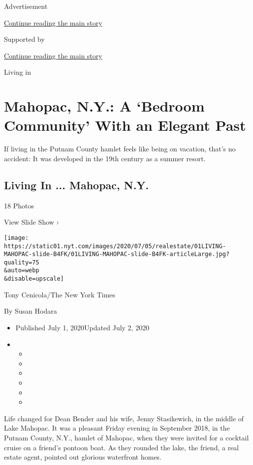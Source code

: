 Advertisement

\protect\hyperlink{after-top}{Continue reading the main story}

Supported by

\protect\hyperlink{after-sponsor}{Continue reading the main story}

Living in

\hypertarget{mahopac-ny-a-bedroom-community-with-an-elegant-past}{%
\section{Mahopac, N.Y.: A `Bedroom Community' With an Elegant
Past}\label{mahopac-ny-a-bedroom-community-with-an-elegant-past}}

If living in the Putnam County hamlet feels like being on vacation,
that's no accident: It was developed in the 19th century as a summer
resort.

\href{https://www.nytimes.com/slideshow/2020/07/01/realestate/living-in-mahopac-ny.html}{}

\hypertarget{living-in--mahopac-ny}{%
\subsection{Living In ... Mahopac, N.Y.}\label{living-in--mahopac-ny}}

18 Photos

View Slide Show ›

\texttt{[image: https://static01.nyt.com/images/2020/07/05/realestate/01LIVING-MAHOPAC-slide-B4FK/01LIVING-MAHOPAC-slide-B4FK-articleLarge.jpg?quality=75\\\&auto=webp\\\&disable=upscale]}

Tony Cenicola/The New York Times

By Susan Hodara

\begin{itemize}
\item
  Published July 1, 2020Updated July 2, 2020
\item
  \begin{itemize}
  \item
  \item
  \item
  \item
  \item
  \item
  \end{itemize}
\end{itemize}

Life changed for Dean Bender and his wife, Jenny Stasikewich, in the
middle of Lake Mahopac. It was a pleasant Friday evening in September
2018, in the Putnam County, N.Y., hamlet of Mahopac, when they were
invited for a cocktail cruise on a friend's pontoon boat. As they
rounded the lake, the friend, a real estate agent, pointed out glorious
waterfront homes.


